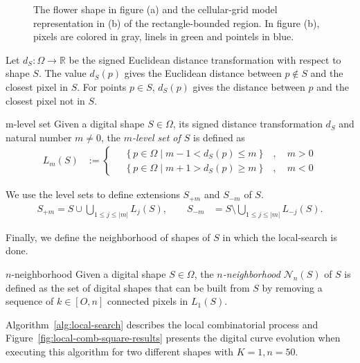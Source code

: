 \begin{figure}[h!]
{	}
	\caption{The flower shape in figure (a) and the cellular-grid model representation in (b) of the rectangle-bounded region. In figure (b), pixels are colored in gray, linels in green and pointels in blue.}
	\label{fig:cellular-grid-model}
\end{figure}


Let $d_{S}:\Omega \rightarrow \mathbb{R}$ be the signed Euclidean distance transformation with respect to shape $S$. The value $d_S(p)$ gives the Euclidean distance between $p \notin S$ and the closest pixel in $S$. For points $p \in S$, $d_S(p)$ gives the distance between $p$ and the closest pixel not in $S$.


\begin{definition}{m-level set}
Given a digital shape $S\in\Omega$, its signed distance transformation $d_S$ and natural number $m \neq 0$, the {\em $m$-level set of $S$} is defined as
\begin{align*}
	L_m(S) &:= \left\{ \quad \begin{array}{cc}
		\left\{ p \in \Omega \; | \; m-1 < d_S(p) \leq m \right\} & , \quad m>0\\
		\left\{ p \in \Omega \; | \; m+1 > d_S(p) \geq m \right\} & , \quad m<0
		\end{array} \right.
\end{align*}
\end{definition}

We use the level sets to define extensions $S_{+m}$ and $S_{-m}$ of $S$.
\begin{align*}
	S_{+m} = S \cup \bigcup_{1 \leq j \leq |m|} L_j(S), \quad \quad S_{-m} &= S \setminus \bigcup_{1 \leq j \leq |m|} L_{-j}(S).
\end{align*}

Finally, we define the neighborhood of shapes of $S$ in which the local-search is done.

\begin{definition}{$n$-neighborhood}
	Given a digital shape $S \in \Omega$, the \emph{ $n$-neighborhood} $\mathcal{N}_n(S)$ of $S$  is defined as the set of digital shapes that can be built from $S$ by removing a sequence of $k \in [O,n]$ connected pixels in $L_1(S)$.
\end{definition}

Algorithm~\ref{alg:local-search} describes the local combinatorial process and Figure~\ref{fig:local-comb-square-results} presents the digital curve evolution when executing this algorithm for two different shapes with $K=1,n=50$.


